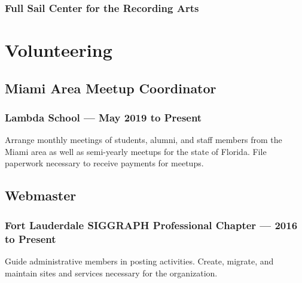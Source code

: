 \documentclass{article}
\begin{document}
\subsubsection{Full Sail Center for the Recording Arts}



\section{Volunteering}
\subsection{Miami Area Meetup Coordinator}
\subsubsection{Lambda School --- May 2019 to Present}
Arrange monthly meetings of students, alumni, and staff members from the Miami area as well as semi-yearly meetups for the state of Florida.
File paperwork necessary to receive payments for meetups.


\subsection{Webmaster}
\subsubsection{Fort Lauderdale SIGGRAPH Professional Chapter --- 2016 to Present}
Guide administrative members in posting activities.
Create, migrate, and maintain sites and services necessary for the organization.
\end{document}
